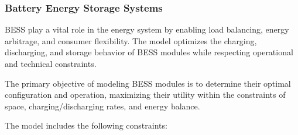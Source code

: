 \documentclass[11pt]{article}
\begin{document}
\subsubsection{Battery Energy Storage Systems}
\label{sec:bess}

BESS play a vital role in the energy system by enabling load balancing, energy arbitrage, and consumer flexibility. The model optimizes the charging, discharging, and storage behavior of BESS modules while respecting operational and technical constraints.

The primary objective of modeling BESS modules is to determine their optimal configuration and operation, maximizing their utility within the constraints of space, charging/discharging rates, and energy balance.

The model includes the following constraints:
\end{document}

